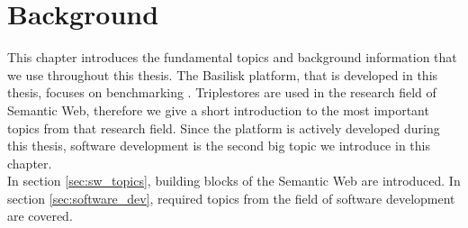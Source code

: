 \chapter{Background}
\label{ch:background}

This chapter introduces the fundamental topics and background information that we use throughout this thesis.
The Basilisk platform, that is developed in this thesis, focuses on benchmarking \tsp{}.
Triplestores are used in the research field of Semantic Web, therefore we give a short introduction to the most important topics from that research field.
Since the platform is actively developed during this thesis, software development is the second big topic we introduce in this chapter.
\\

In section \ref{sec:sw_topics}, building blocks of the Semantic Web are introduced.
In section \ref{sec:software_dev}, required topics from the field of software development are covered.




